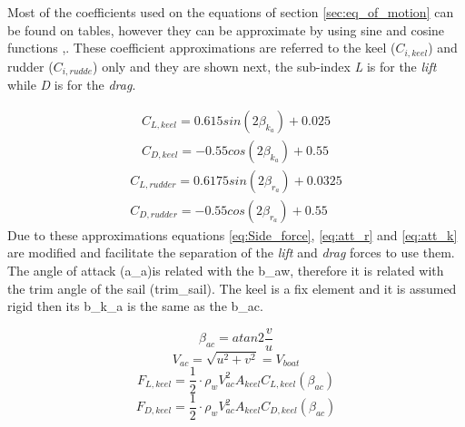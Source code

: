 Most of the coefficients used on the equations of section \ref{sec:eq_of_motion} can be found on tables, however they can be approximate by using sine and cosine functions \cite{rein2012tra},\cite{moreira2011guidance}. These coefficient approximations are referred to the keel ($C_{i,keel}$) and rudder ($C_{i,rudde}$) only and they are shown next, the sub-index \textit{L} is for the \textit{lift} while \textit{D} is for the \textit{drag}. \par 
\begin{subequations} \label{eq:keel_coeff}
    \begin{align}
        C_{L,keel}=0.615sin(2\beta_{k_{a}})+0.025 \label{eq:keel_Liftcoeff}\\ 
        C_{D,keel}=-0.55cos(2\beta_{k_{a}})+0.55 \label{eq:keel_Dragcoeff}
    \end{align}
\end{subequations}
\begin{subequations} \label{eq:rudder_coeff}
    \begin{align}
        C_{L,rudder}=0.6175sin(2\beta_{r_{a}})+0.0325 \label{eq:rudder_Liftcoeff}\\ 
        C_{D,rudder}=-0.55cos(2\beta_{r_{a}})+0.55 \label{eq:rudder_Dragcoeff}
    \end{align}
\end{subequations}
Due to these approximations equations \ref{eq:Side_force}, \ref{eq:att_r} and \ref{eq:att_k} are modified and facilitate the separation of the \textit{lift} and \textit{drag} forces to use them. The angle of attack (\acrshort{a_a})is related with the \acrshort{b_aw}, therefore it is related with the trim angle of the sail (\acrshort{trim_sail}). The keel is a fix element and it is assumed rigid then its \acrshort{b_k_a} is the same as the \acrshort{b_ac}.   \par \noindent %
\begin{equation} \label{eq:app_current_ang}
    \beta_{ac}=atan2\frac{v}{u}
\end{equation}
\begin{equation} \label{eq:app_current_vel}
    V_{ac}=\sqrt{u^2 + v^2}=V_{boat}
\end{equation}
\begin{equation} \label{eq:keel_lift}
    F_{L,keel}=\frac{1}{2} \cdot \rho_{w} V_{ac}^2 A_{keel}C_{L,keel}(\beta_{ac})
\end{equation}
\begin{equation} \label{eq:keel_drag}
    F_{D,keel}=\frac{1}{2} \cdot \rho_{w} V_{ac}^2 A_{keel}C_{D,keel}(\beta_{ac})
\end{equation}
